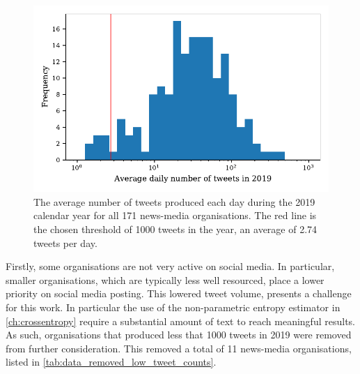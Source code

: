 \begin{figure}[h!]
	\centering
	\includegraphics{chapter1/figs/averagetweetactivity}
	\caption{The average number of tweets produced each day during the 2019 calendar year for all 171 news-media organisations. The red line is the chosen threshold of 1000 tweets in the year, an average of 2.74 tweets per day. }
	\label{fig:data_cleaning_average_tweet_activity}
\end{figure}

Firstly, some organisations are not very active on social media. In particular, smaller organisations, which are typically less well resourced, place a lower priority on social media posting. This lowered tweet volume, presents a challenge for this work. In particular the use of the non-parametric entropy estimator in \autoref{ch:crossentropy} require a substantial amount of text to reach meaningful results. As such, organisations that produced less that 1000 tweets in 2019 were removed from further consideration. This removed a total of 11 news-media organisations, listed in  \autoref{tab:data_removed_low_tweet_counts}.


